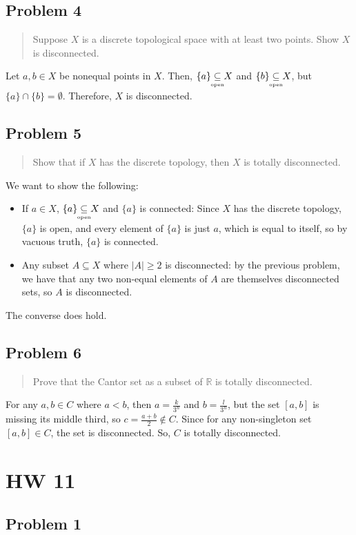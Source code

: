 \documentclass[8pt]{extarticle}
\newcommand{\open}{\underset{\clap{\tiny open}}{\subseteq}}
\begin{document}
{\subsection*{Problem 4}%
\begin{quote}
	Suppose $X$ is a discrete topological space with at least two points. Show $X$ is disconnected.
\end{quote}
Let $a,b\in X$ be nonequal points in $X$. Then, $\{a\}\open X$ and $\{b\}\open X$, but $\{a\}\cap\{b\} = \emptyset$. Therefore, $X$ is disconnected.
\subsection*{Problem 5}%
\begin{quote}
	Show that if $X$ has the discrete topology, then $X$ is totally disconnected.
\end{quote}
We want to show the following:
\begin{itemize}
	\item If $a \in X$, $\{a\}\open X$ and $\{a\}$ is connected: Since $X$ has the discrete topology, $\{a\}$ is open, and every element of $\{a\}$ is just $a$, which is equal to itself, so by vacuous truth, $\{a\}$ is connected.
	\item Any subset $A\subseteq X$ where $|A|\geq 2$ is disconnected: by the previous problem, we have that any two non-equal elements of $A$ are themselves disconnected sets, so $A$ is disconnected.
\end{itemize}
The converse does hold.
\subsection*{Problem 6}%

\begin{quote}
	Prove that the Cantor set as a subset of $\mathbb R$ is totally disconnected.
\end{quote}
For any $a,b\in C$ where $a<b$, then $a = \frac{k}{3^n}$ and $b = \frac{l}{3^n}$, but the set $[a,b]$ is missing its middle third, so $c = \frac{a+b}{2} \not\in C$. Since for any non-singleton set $[a,b]\in C$, the set is disconnected. So, $C$ is totally disconnected.
\pagebreak
\section*{HW 11}

\subsection*{Problem 1}%

}
\end{document}
